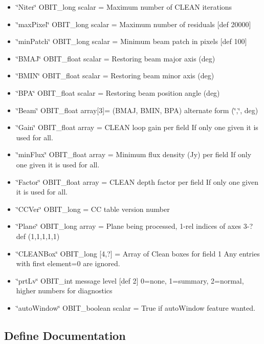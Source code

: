 \begin{itemize}
\item \char`\"{}Niter\char`\"{} OBIT\_\-long scalar = Maximum number of CLEAN iterations \item \char`\"{}max\-Pixel\char`\"{} OBIT\_\-long scalar = Maximum number of residuals [def 20000] \item \char`\"{}min\-Patch\char`\"{} OBIT\_\-long scalar = Minimum beam patch in pixels [def 100] \item \char`\"{}BMAJ\char`\"{} OBIT\_\-float scalar = Restoring beam major axis (deg) \item \char`\"{}BMIN\char`\"{} OBIT\_\-float scalar = Restoring beam minor axis (deg) \item \char`\"{}BPA\char`\"{} OBIT\_\-float scalar = Restoring beam position angle (deg) \item \char`\"{}Beam\char`\"{} OBIT\_\-float array[3]= (BMAJ, BMIN, BPA) alternate form (\char`\"{},\char`\"{}, deg) \item \char`\"{}Gain\char`\"{} OBIT\_\-float array = CLEAN loop gain per field If only one given it is used for all. \item \char`\"{}min\-Flux\char`\"{} OBIT\_\-float array = Minimum flux density (Jy) per field If only one given it is used for all. \item \char`\"{}Factor\char`\"{} OBIT\_\-float array = CLEAN depth factor per field If only one given it is used for all. \item \char`\"{}CCVer\char`\"{} OBIT\_\-long = CC table version number \item \char`\"{}Plane\char`\"{} OBIT\_\-long array = Plane being processed, 1-rel indices of axes 3-? def (1,1,1,1,1) \item \char`\"{}CLEANBox\char`\"{} OBIT\_\-long [4,?] = Array of Clean boxes for field 1 Any entries with first element=0 are ignored. \item \char`\"{}prt\-Lv\char`\"{} OBIT\_\-int message level [def 2] 0=none, 1=summary, 2=normal, higher numbers for diagnostics \item \char`\"{}auto\-Window\char`\"{} OBIT\_\-boolean scalar = True if auto\-Window feature wanted.\end{itemize}


\subsection{Define Documentation}
